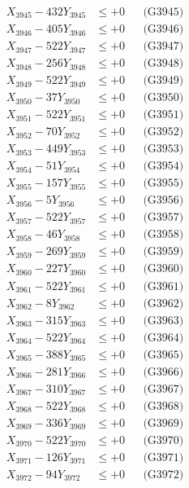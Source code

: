 \documentclass[a4paper,10pt]{article}
\begin{document}
{\begin{align}
X_{3945} - 432Y_{3945} &\leq +0 && \text{(G3945)} \\
X_{3946} - 405Y_{3946} &\leq +0 && \text{(G3946)} \\
X_{3947} - 522Y_{3947} &\leq +0 && \text{(G3947)} \\
X_{3948} - 256Y_{3948} &\leq +0 && \text{(G3948)} \\
X_{3949} - 522Y_{3949} &\leq +0 && \text{(G3949)} \\
X_{3950} - 37Y_{3950} &\leq +0 && \text{(G3950)} \\
\allowbreak
X_{3951} - 522Y_{3951} &\leq +0 && \text{(G3951)} \\
X_{3952} - 70Y_{3952} &\leq +0 && \text{(G3952)} \\
X_{3953} - 449Y_{3953} &\leq +0 && \text{(G3953)} \\
X_{3954} - 51Y_{3954} &\leq +0 && \text{(G3954)} \\
X_{3955} - 157Y_{3955} &\leq +0 && \text{(G3955)} \\
X_{3956} - 5Y_{3956} &\leq +0 && \text{(G3956)} \\
X_{3957} - 522Y_{3957} &\leq +0 && \text{(G3957)} \\
X_{3958} - 46Y_{3958} &\leq +0 && \text{(G3958)} \\
X_{3959} - 269Y_{3959} &\leq +0 && \text{(G3959)} \\
X_{3960} - 227Y_{3960} &\leq +0 && \text{(G3960)} \\
\allowbreak
X_{3961} - 522Y_{3961} &\leq +0 && \text{(G3961)} \\
X_{3962} - 8Y_{3962} &\leq +0 && \text{(G3962)} \\
X_{3963} - 315Y_{3963} &\leq +0 && \text{(G3963)} \\
X_{3964} - 522Y_{3964} &\leq +0 && \text{(G3964)} \\
X_{3965} - 388Y_{3965} &\leq +0 && \text{(G3965)} \\
X_{3966} - 281Y_{3966} &\leq +0 && \text{(G3966)} \\
X_{3967} - 310Y_{3967} &\leq +0 && \text{(G3967)} \\
X_{3968} - 522Y_{3968} &\leq +0 && \text{(G3968)} \\
X_{3969} - 336Y_{3969} &\leq +0 && \text{(G3969)} \\
X_{3970} - 522Y_{3970} &\leq +0 && \text{(G3970)} \\
\allowbreak
X_{3971} - 126Y_{3971} &\leq +0 && \text{(G3971)} \\
X_{3972} - 94Y_{3972} &\leq +0 && \text{(G3972)} \\

\end{align}}
\end{document}
